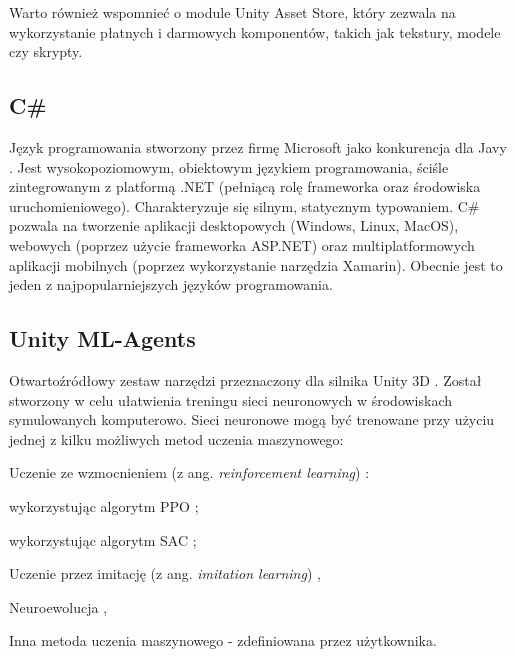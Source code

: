 Warto również wspomnieć o module Unity Asset Store, który zezwala na wykorzystanie płatnych i darmowych komponentów, takich jak tekstury, modele czy skrypty.

\subsection{C\#}
Język programowania stworzony przez firmę Microsoft jako konkurencja dla Javy \cite{csharp:opis}. Jest wysokopoziomowym, obiektowym językiem programowania, ściśle zintegrowanym z platformą .NET (pełniącą rolę frameworka oraz środowiska uruchomieniowego). Charakteryzuje się silnym, statycznym typowaniem. C\# pozwala na tworzenie aplikacji desktopowych (Windows, Linux, MacOS), webowych (poprzez użycie frameworka ASP.NET) oraz multiplatformowych aplikacji mobilnych (poprzez wykorzystanie narzędzia Xamarin). Obecnie jest to jeden z najpopularniejszych języków programowania.

\subsection{Unity ML-Agents}
\label{UnityMlSection}
Otwartoźródłowy zestaw narzędzi przeznaczony dla silnika Unity 3D \cite{unitymla:overview}. Został stworzony w celu ułatwienia treningu sieci neuronowych w środowiskach symulowanych komputerowo. Sieci neuronowe mogą być trenowane przy użyciu jednej z kilku możliwych metod uczenia maszynowego:
\begin{enumerate*}
\item Uczenie ze wzmocnieniem (z ang. \textit{reinforcement learning}) \cite{deepRL:guide}:
\begin{itemize*}
\item wykorzystując algorytm PPO \cite{ppo:opis};
\item wykorzystując algorytm SAC \cite{sac:opis};
\end{itemize*}
\item Uczenie przez imitację (z ang. \textit{imitation learning}) \cite{imitationLearning:article},
\item Neuroewolucja \cite{neuroevolution:primer},
\item Inna metoda uczenia maszynowego - zdefiniowana przez użytkownika.
\end{enumerate*}


